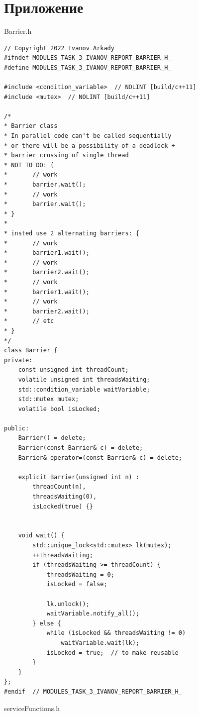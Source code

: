 \documentclass{report}
\begin{document}
\section*{Приложение}
Barrier.h
\begin{lstlisting}
// Copyright 2022 Ivanov Arkady
#ifndef MODULES_TASK_3_IVANOV_REPORT_BARRIER_H_
#define MODULES_TASK_3_IVANOV_REPORT_BARRIER_H_

#include <condition_variable>  // NOLINT [build/c++11]
#include <mutex>  // NOLINT [build/c++11]

/*
* Barrier class
* In parallel code can't be called sequentially
* or there will be a possibility of a deadlock +
* barrier crossing of single thread
* NOT TO DO: {
*       // work
*       barrier.wait();
*       // work
*       barrier.wait();
* }
*
* insted use 2 alternating barriers: {
*       // work
*       barrier1.wait();
*       // work
*       barrier2.wait();
*       // work
*       barrier1.wait();
*       // work
*       barrier2.wait();
*       // etc
* }
*/
class Barrier {
private:
    const unsigned int threadCount;
    volatile unsigned int threadsWaiting;
    std::condition_variable waitVariable;
    std::mutex mutex;
    volatile bool isLocked;

public:
    Barrier() = delete;
    Barrier(const Barrier& c) = delete;
    Barrier& operator=(const Barrier& c) = delete;

    explicit Barrier(unsigned int n) :
        threadCount(n),
        threadsWaiting(0),
        isLocked(true) {}


    void wait() {
        std::unique_lock<std::mutex> lk(mutex);
        ++threadsWaiting;
        if (threadsWaiting >= threadCount) {
            threadsWaiting = 0;
            isLocked = false;

            lk.unlock();
            waitVariable.notify_all();
        } else {
            while (isLocked && threadsWaiting != 0)
                waitVariable.wait(lk);
            isLocked = true;  // to make reusable
        }
    }
};
#endif  // MODULES_TASK_3_IVANOV_REPORT_BARRIER_H_
\end{lstlisting}
serviceFunctions.h
\end{document}

